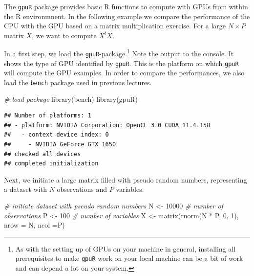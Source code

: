 \documentclass[
  12pt,
]{style/krantz}
\newenvironment{Shaded}{\begin{snugshade}}{\end{snugshade}}
\newcommand{\AttributeTok}[1]{\textcolor[rgb]{0.77,0.63,0.00}{#1}}
\newcommand{\CommentTok}[1]{\textcolor[rgb]{0.56,0.35,0.01}{\textit{#1}}}
\newcommand{\DecValTok}[1]{\textcolor[rgb]{0.00,0.00,0.81}{#1}}
\newcommand{\FunctionTok}[1]{\textcolor[rgb]{0.00,0.00,0.00}{#1}}
\newcommand{\NormalTok}[1]{#1}
\newcommand{\OtherTok}[1]{\textcolor[rgb]{0.56,0.35,0.01}{#1}}
\newcommand{\SpecialCharTok}[1]{\textcolor[rgb]{0.00,0.00,0.00}{#1}}
\begin{document}
The \texttt{gpuR} package provides basic R functions to compute with GPUs from within the R environmnent. In the following example we compare the performance of the CPU with the GPU based on a matrix multiplication exercise. For a large \(N\times P\) matrix \(X\), we want to compute \(X^tX\).

In a first step, we load the \texttt{gpuR}-package.\footnote{As with the setting up of GPUs on your machine in general, installing all prerequisites to make \texttt{gpuR} work on your local machine can be a bit of work and can depend a lot on your system.} Note the output to the console. It shows the type of GPU identified by \texttt{gpuR}. This is the platform on which \texttt{gpuR} will compute the GPU examples. In order to compare the performances, we also load the \texttt{bench} package used in previous lectures.

\begin{Shaded}
\begin{Highlighting}[]
\CommentTok{\# load package}
\FunctionTok{library}\NormalTok{(bench)}
\FunctionTok{library}\NormalTok{(gpuR)}
\end{Highlighting}
\end{Shaded}

\begin{verbatim}
## Number of platforms: 1
## - platform: NVIDIA Corporation: OpenCL 3.0 CUDA 11.4.158
##   - context device index: 0
##     - NVIDIA GeForce GTX 1650
## checked all devices
## completed initialization
\end{verbatim}

Next, we initiate a large matrix filled with pseudo random numbers, representing a dataset with \(N\) observations and \(P\) variables.

\begin{Shaded}
\begin{Highlighting}[]
\CommentTok{\# initiate dataset with pseudo random numbers}
\NormalTok{N }\OtherTok{\textless{}{-}} \DecValTok{10000}  \CommentTok{\# number of observations}
\NormalTok{P }\OtherTok{\textless{}{-}} \DecValTok{100} \CommentTok{\# number of variables}
\NormalTok{X }\OtherTok{\textless{}{-}} \FunctionTok{matrix}\NormalTok{(}\FunctionTok{rnorm}\NormalTok{(N }\SpecialCharTok{*}\NormalTok{ P, }\DecValTok{0}\NormalTok{, }\DecValTok{1}\NormalTok{), }\AttributeTok{nrow =}\NormalTok{ N, }\AttributeTok{ncol =}\NormalTok{P)}
\end{Highlighting}
\end{Shaded}
\end{document}
